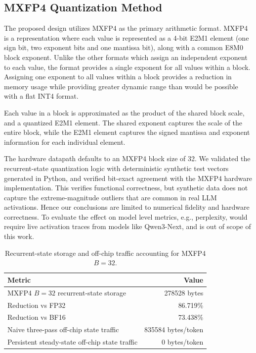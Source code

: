 ﻿\documentclass[conference]{IEEEtran}
\begin{document}
\subsection{MXFP4 Quantization Method}

The proposed design utilizes MXFP4 as the primary arithmetic format. MXFP4 is a representation where each value is represented as a 4-bit E2M1 element (one sign bit, two exponent bits and one mantissa bit), along with a common E8M0 block exponent. Unlike the other formats which assign an independent exponent to each value, the format provides a single exponent for all values within a block. Assigning one exponent to all values within a block provides a reduction in memory usage while providing greater dynamic range than would be possible with a flat INT4 format.

Each value in a block is approximated as the product of the shared block scale, and a quantized E2M1 element. The shared exponent captures the scale of the entire block, while the E2M1 element captures the signed mantissa and exponent information for each individual element.

The hardware datapath defaults to an MXFP4 block size of 32. We validated the recurrent-state quantization logic with deterministic synthetic test vectors generated in Python, and verified bit-exact agreement with the MXFP4 hardware implementation. This verifies functional correctness, but synthetic data does not capture the extreme-magnitude outliers that are common in real LLM activations. Hence our conclusions are limited to numerical fidelity and hardware correctness. To evaluate the effect on model level metrics, e.g., perplexity, would require live activation traces from models like Qwen3-Next, and is out of scope of this work.

\begin{table}[t]
\centering
\caption{Recurrent-state storage and off-chip traffic accounting for MXFP4 $B=32$.}
\label{tab:state_traffic_results}
\footnotesize
\renewcommand{\arraystretch}{1.0}
\setlength{\tabcolsep}{6pt}
\begin{tabularx}{\linewidth}{Xr}
\toprule
Metric & Value \\
\midrule
MXFP4 $B=32$ recurrent-state storage & 278528 bytes \\
Reduction vs FP32 & 86.719\% \\
Reduction vs BF16 & 73.438\% \\
Naive three-pass off-chip state traffic & 835584 bytes/token \\
Persistent steady-state off-chip state traffic & 0 bytes/token \\
\bottomrule
\end{tabularx}
\end{table}
\end{document}
